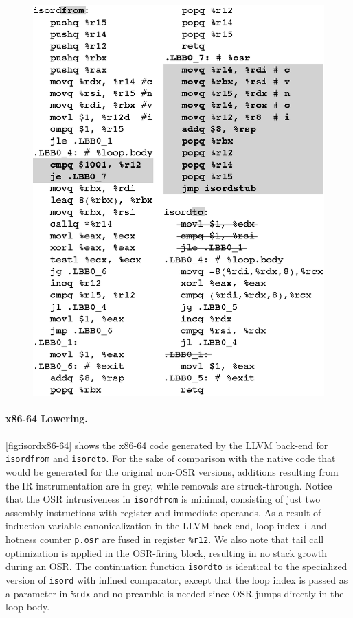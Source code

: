 \ifdefined\noauthorea
\begin{figure}[t]
\begin{center}
\includegraphics[width=0.9\columnwidth]{figures/isordx86-64/isordx86-64.eps}
\caption{\protect}
\end{center}
\end{figure}
\fi

\paragraph{x86-64 Lowering.}
\label{se:ir-x86-lowering}

\myfigure\ref{fig:isordx86-64} shows the x86-64 code generated by the LLVM back-end for {\tt isordfrom} and {\tt isordto}. For the sake of comparison with the native code that would be generated for the original non-OSR versions, additions resulting from the IR instrumentation are in grey, while removals are struck-through. Notice that the OSR intrusiveness in {\tt isordfrom} is minimal, consisting of just two assembly instructions with register and immediate operands. As a result of induction variable canonicalization in the LLVM back-end, loop index {\tt i} and hotness counter {\tt p.osr} are fused in register {\tt\%r12}. We also note that tail call optimization is applied in the OSR-firing block, resulting in no stack growth during an OSR. The continuation function {\tt isordto} is identical to the specialized version of {\tt isord} with inlined comparator, except that the loop index is passed as a parameter in {\tt \%rdx} and no %
preamble is needed since OSR jumps directly in the loop body.

